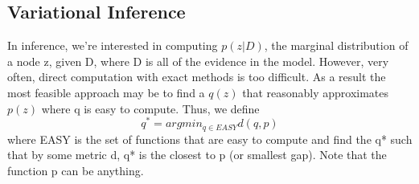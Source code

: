 \documentclass{article}
\begin{document}

\subsection{Variational Inference}
In inference, we're interested in computing $p(z|D)$, the marginal distribution of a node z, given D, where D is all of the evidence in the model.  However, very often, direct computation with exact methods is too difficult.  As a result the most feasible approach may be to find a $q(z)$ that reasonably approximates $p(z)$ where q is easy to compute.  Thus, we define
\[q^* = argmin_{q\in EASY} d(q,p)\]
where EASY is the set of functions that are easy to compute and find the q* such that by some metric d, q* is the closest to p (or smallest gap).  Note that the function p can be anything.
\end{document}

